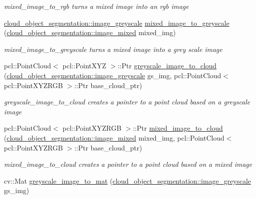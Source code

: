 \begin{DoxyCompactItemize}
\begin{DoxyCompactList}\small\item\em mixed\+\_\+image\+\_\+to\+\_\+rgb turns a mixed image into an rgb image \end{DoxyCompactList}\item 
\hyperlink{classcloud__object__segmentation_1_1image__greyscale}{cloud\+\_\+object\+\_\+segmentation\+::image\+\_\+greyscale} \hyperlink{namespacecloud__object__segmentation_1_1image__processing_ad513a6b22d1c0001464a93ab26ec1ff2}{mixed\+\_\+image\+\_\+to\+\_\+greyscale} (\hyperlink{classcloud__object__segmentation_1_1image__mixed}{cloud\+\_\+object\+\_\+segmentation\+::image\+\_\+mixed} mixed\+\_\+img)
\begin{DoxyCompactList}\small\item\em mixed\+\_\+image\+\_\+to\+\_\+greyscale turns a mixed image into a grey scale image \end{DoxyCompactList}\item 
pcl\+::\+Point\+Cloud$<$ pcl\+::\+Point\+X\+YZ $>$\+::Ptr \hyperlink{namespacecloud__object__segmentation_1_1image__processing_af2913993d2c8910f172093f6f84e54e0}{greyscale\+\_\+image\+\_\+to\+\_\+cloud} (\hyperlink{classcloud__object__segmentation_1_1image__greyscale}{cloud\+\_\+object\+\_\+segmentation\+::image\+\_\+greyscale} gs\+\_\+img, pcl\+::\+Point\+Cloud$<$ pcl\+::\+Point\+X\+Y\+Z\+R\+GB $>$\+::Ptr base\+\_\+cloud\+\_\+ptr)
\begin{DoxyCompactList}\small\item\em greyscale\+\_\+image\+\_\+to\+\_\+cloud creates a pointer to a point cloud based on a greyscale image \end{DoxyCompactList}\item 
pcl\+::\+Point\+Cloud$<$ pcl\+::\+Point\+X\+Y\+Z\+R\+GB $>$\+::Ptr \hyperlink{namespacecloud__object__segmentation_1_1image__processing_a9ef590cc362ad28ac42c8bf2a24ab829}{mixed\+\_\+image\+\_\+to\+\_\+cloud} (\hyperlink{classcloud__object__segmentation_1_1image__mixed}{cloud\+\_\+object\+\_\+segmentation\+::image\+\_\+mixed} mixed\+\_\+img, pcl\+::\+Point\+Cloud$<$ pcl\+::\+Point\+X\+Y\+Z\+R\+GB $>$\+::Ptr base\+\_\+cloud\+\_\+ptr)
\begin{DoxyCompactList}\small\item\em mixed\+\_\+image\+\_\+to\+\_\+cloud creates a pointer to a point cloud based on a mixed image \end{DoxyCompactList}\item 
cv\+::\+Mat \hyperlink{namespacecloud__object__segmentation_1_1image__processing_af8b94fd217563c1d63343d90529b4b8c}{greyscale\+\_\+image\+\_\+to\+\_\+mat} (\hyperlink{classcloud__object__segmentation_1_1image__greyscale}{cloud\+\_\+object\+\_\+segmentation\+::image\+\_\+greyscale} gs\+\_\+img)

\end{DoxyCompactItemize}
